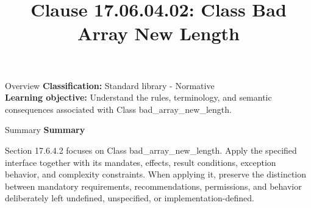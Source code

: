 \documentclass[10pt,letterpaper]{article}
\title{Clause 17.06.04.02: Class Bad Array New Length}
\author{}
\date{}
\begin{document}
\maketitle
\begin{CornellOverviewBox}{Overview}
\textbf{Classification:} Standard library - Normative\\[2pt]
\textbf{Learning objective:} Understand the rules, terminology, and semantic consequences associated with Class bad\_array\_new\_length.
\end{CornellOverviewBox}\begin{CornellSummaryBox}{Summary}
{\sffamily\bfseries\color{Accent} Summary}\par\vspace{3pt}Section 17.6.4.2 focuses on Class bad\_array\_new\_length. Apply the specified interface together with its mandates, effects, result conditions, exception behavior, and complexity constraints. When applying it, preserve the distinction between mandatory requirements, recommendations, permissions, and behavior deliberately left undefined, unspecified, or implementation-defined.
\end{CornellSummaryBox}
\end{document}
